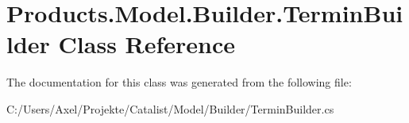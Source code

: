 \hypertarget{class_products_1_1_model_1_1_builder_1_1_termin_builder}{}\section{Products.\+Model.\+Builder.\+Termin\+Builder Class Reference}
\label{class_products_1_1_model_1_1_builder_1_1_termin_builder}


The documentation for this class was generated from the following file\+:\begin{DoxyCompactItemize}
\item 
C\+:/\+Users/\+Axel/\+Projekte/\+Catalist/\+Model/\+Builder/Termin\+Builder.\+cs\end{DoxyCompactItemize}
